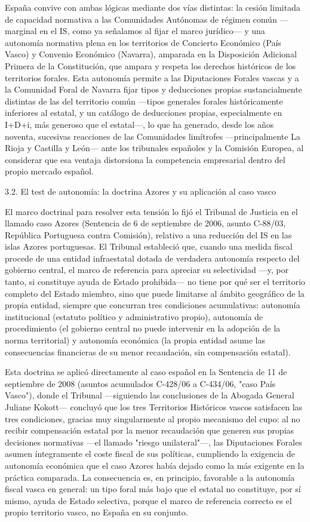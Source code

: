 \documentclass[10pt,a4paper]{article}
\begin{document}
España convive con ambas lógicas mediante dos vías distintas: la cesión limitada de capacidad normativa a las Comunidades Autónomas de régimen común —marginal en el IS, como ya señalamos al fijar el marco jurídico— y una autonomía normativa plena en los territorios de Concierto Económico (País Vasco) y Convenio Económico (Navarra), amparada en la Disposición Adicional Primera de la Constitución, que ampara y respeta los derechos históricos de los territorios forales. Esta autonomía permite a las Diputaciones Forales vascas y a la Comunidad Foral de Navarra fijar tipos y deducciones propias sustancialmente distintas de las del territorio común —tipos generales forales históricamente inferiores al estatal, y un catálogo de deducciones propias, especialmente en I+D+i, más generoso que el estatal—, lo que ha generado, desde los años noventa, sucesivas reacciones de las Comunidades limítrofes —principalmente La Rioja y Castilla y León— ante los tribunales españoles y la Comisión Europea, al considerar que esa ventaja distorsiona la competencia empresarial dentro del propio mercado español.

3.2. El test de autonomía: la doctrina Azores y su aplicación al caso vasco

El marco doctrinal para resolver esta tensión lo fijó el Tribunal de Justicia en el llamado caso Azores (Sentencia de 6 de septiembre de 2006, asunto C-88/03, República Portuguesa contra Comisión), relativo a una reducción del IS en las islas Azores portuguesas. El Tribunal estableció que, cuando una medida fiscal procede de una entidad infraestatal dotada de verdadera autonomía respecto del gobierno central, el marco de referencia para apreciar su selectividad —y, por tanto, si constituye ayuda de Estado prohibida— no tiene por qué ser el territorio completo del Estado miembro, sino que puede limitarse al ámbito geográfico de la propia entidad, siempre que concurran tres condiciones acumulativas: autonomía institucional (estatuto político y administrativo propio), autonomía de procedimiento (el gobierno central no puede intervenir en la adopción de la norma territorial) y autonomía económica (la propia entidad asume las consecuencias financieras de su menor recaudación, sin compensación estatal).

Esta doctrina se aplicó directamente al caso español en la Sentencia de 11 de septiembre de 2008 (asuntos acumulados C-428/06 a C-434/06, "caso País Vasco"), donde el Tribunal —siguiendo las conclusiones de la Abogada General Juliane Kokott— concluyó que los tres Territorios Históricos vascos satisfacen las tres condiciones, gracias muy singularmente al propio mecanismo del cupo: al no recibir compensación estatal por la menor recaudación que generen sus propias decisiones normativas —el llamado "riesgo unilateral"—, las Diputaciones Forales asumen íntegramente el coste fiscal de sus políticas, cumpliendo la exigencia de autonomía económica que el caso Azores había dejado como la más exigente en la práctica comparada. La consecuencia es, en principio, favorable a la autonomía fiscal vasca en general: un tipo foral más bajo que el estatal no constituye, por sí mismo, ayuda de Estado selectiva, porque el marco de referencia correcto es el propio territorio vasco, no España en su conjunto.
\end{document}

